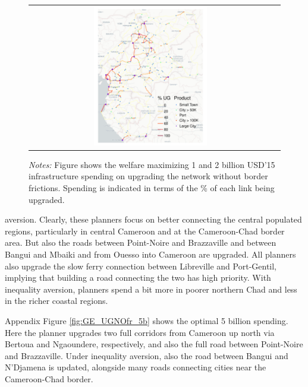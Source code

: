 \documentclass[a4paper]{article}
\begin{document}
\begin{figure}[H]
{\begin{tabular}{cc}
\includegraphics[width=0.48\textwidth]{"../figures/GE/trans_africa_network_GE_20g_2b_fixed_cgc_sigma3.8_rho2_julia_google_perc_ug.pdf"}
\end{tabular}
}
\scriptsize 
\emph{Notes:} Figure shows the welfare maximizing 1 and 2 billion USD'15 infrastructure spending on upgrading the network without border frictions. Spending is indicated in terms of the \% of each link being upgraded.  
\vspace{-1mm}
\end{figure}

\noindent aversion. Clearly, these planners focus on better connecting the central populated regions, particularly in central Cameroon and at the Cameroon-Chad border area. But also the roads between Point-Noire and Brazzaville and between Bangui and Mbaiki and from Ouesso into Cameroon are upgraded. All planners also upgrade the slow ferry connection between Libreville and 
Port-Gentil, implying that building a road connecting the two has high priority. With inequality aversion, planners spend a bit more in poorer northern Chad and less in the richer coastal regions. \newline 


Appendix Figure \ref{fig:GE_UGNOfr_5b} shows the optimal 5 billion spending. Here the planner upgrades two full corridors from Cameroon up north via Bertoua and Ngaoundere, respectively, and also the full road between Point-Noire and Brazzaville. Under inequality aversion, also the road between Bangui and N'Djamena is updated, alongside many roads connecting cities near the Cameroon-Chad border.  
\end{document}
